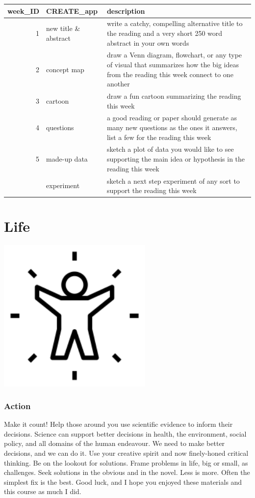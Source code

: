 \documentclass[
]{book}
\begin{document}
\begin{tabular}{rll}
\toprule
week\_ID & CREATE\_app & description\\
\midrule
1 & new title \& abstract & write a catchy, compelling alternative title to the reading and a very short 250 word abstract in your own words\\
2 & concept map & draw a Venn diagram, flowchart, or any type of visual that summarizes how the big ideas from the reading this week connect to one another\\
3 & cartoon & draw a fun cartoon summarizing the reading this week\\
4 & questions & a good reading or paper should generate as many new questions as the ones it answers, list a few for the reading this week\\
5 & made-up data & sketch a plot of data you would like to see supporting the main idea or hypothesis in the reading this week\\
\addlinespace
6 & experiment & sketch a next step experiment of any sort to support the reading this week\\
\bottomrule
\end{tabular}

\hypertarget{life}{%
\chapter{Life}\label{life}}

\includegraphics[width=3in,height=\textheight]{./life.png}

\hypertarget{action}{%
\subsection*{Action}\label{action}}

Make it count! Help those around you use scientific evidence to inform their decisions. Science can support better decisions in health, the environment, social policy, and all domains of the human endeavour. We need to make better decisions, and we can do it. Use your creative spirit and now finely-honed critical thinking. Be on the lookout for solutions. Frame problems in life, big or small, as challenges. Seek solutions in the obvious and in the novel. Less is more. Often the simplest fix is the best. Good luck, and I hope you enjoyed these materials and this course as much I did.

  
\end{document}
